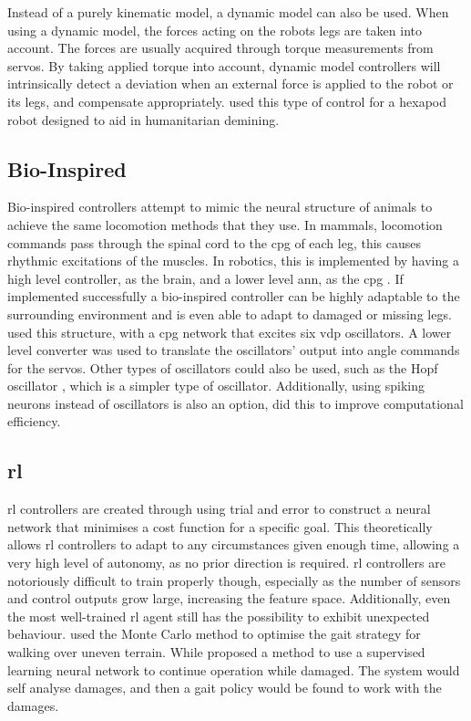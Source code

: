     Instead of a purely kinematic model, a dynamic model can also be used. When using a dynamic model, the forces acting on the robots legs are taken into account. The forces are usually acquired through torque measurements from servos. By taking applied torque into account, dynamic model controllers will intrinsically detect a deviation when an external force is applied to the robot or its legs, and compensate appropriately. \cite{Khudher2017} used this type of control for a hexapod robot designed to aid in humanitarian demining.
    
    \subsection{Bio-Inspired}
    Bio-inspired controllers attempt to mimic the neural structure of animals to achieve the same locomotion methods that they use. In mammals, locomotion commands pass through the spinal cord to the \ac{cpg} of each leg, this causes rhythmic excitations of the muscles. In robotics, this is implemented by having a high level controller, as the brain, and a lower level \ac{ann}, as the \ac{cpg} \citep{Guo2019}. If implemented successfully a bio-inspired controller can be highly adaptable to the surrounding environment and is even able to adapt to damaged or missing legs. \cite{Yu2013} used this structure, with a \ac{cpg} network that excites six \ac{vdp} oscillators. A lower level converter was used to translate the oscillators' output into angle commands for the servos. Other types of oscillators could also be used, such as the Hopf oscillator \citep{Chen2012}, which is a simpler type of oscillator. Additionally, using spiking neurons instead of oscillators is also an option, \citep{GUTIERREZGALAN202010} did this to improve computational efficiency.

    \newpage
    \subsection{\acf{rl}}
    \acf{rl} controllers are created through using trial and error to construct a neural network that minimises a cost function for a specific goal. This theoretically allows \ac{rl} controllers to adapt to any circumstances given enough time, allowing a very high level of autonomy, as no prior direction is required. \ac{rl} controllers are notoriously difficult to train properly though, especially as the number of sensors and control outputs grow large, increasing the feature space. Additionally, even the most well-trained \ac{rl} agent still has the possibility to exhibit unexpected behaviour. \cite{Liu2019} used the Monte Carlo method to optimise the gait strategy for walking over uneven terrain. While \cite{Verma2019DeepRL} proposed a method to use a supervised learning neural network to continue operation while damaged. The system would self analyse damages, and then a gait policy would be found to work with the damages.
    
